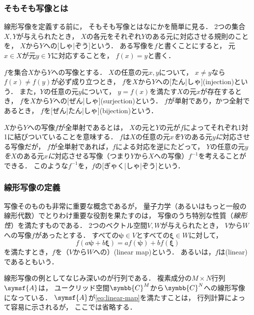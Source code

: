 \documentclass[
]{sotsu}
\newcommand{\bpsi}{\symbf{\psi}}
\newcommand{\bxi}{\symbf{\xi}}
\newcommand{\fire}[1]{\textcolor{fire}{#1}}
\newcommand{\water}[1]{\textcolor{water}{#1}}
\begin{document}
\subsubsection{そもそも写像とは}

\quad
線形写像を定義する前に，
そもそも写像とはなにかを簡単に見る．
2つの集合$X, Y$が与えられたとき，
$X$の各元をそれぞれ$Y$のある元に対応させる規則のことを，
$X$から$Y$への[しゃ|ぞう]という．
ある写像を$f$と書くことにすると，
元$x \in X$が元$y \in Y$に対応することを，
$f(x) = y$と書く．

$f$を集合$X$から$Y$への写像とする．
$X$の任意の元$x, y$について，
$x \neq y$なら$f(x) \neq f(y)$が必ず成り立つとき，
$f$を$X$から$Y$への[たん|しゃ](injection)という．
また，$Y$の任意の元$y$について，
$y = f(x)$を満たす$X$の元$x$が存在するとき，
$f$を$X$から$Y$への[ぜん|しゃ](surjection)という．
$f$が単射であり，かつ全射であるとき，
$f$を[ぜん|たん|しゃ](bijection)という．

$X$から$Y$への写像$f$が全単射であるとは，
$X$の元と$Y$の元が$f$によってそれぞれ1対1に結びついていることを意味する．
$f$は\fire{$X$の任意の元$x$\emph{を}}\water{$Y$のある元$y$\emph{に}}対応させる写像だが，
$f$が全単射であれば，$f$による対応を逆にたどって，
\water{$Y$の任意の元$y$\emph{を}}\fire{$X$のある元$x$\emph{に}}対応させる写像（つまり$Y$から$X$への写像）$f^{-1}$を考えることができる．
このような$f^{-1}$を，$f$の[ぎゃく|しゃ|ぞう]という．


\subsubsection{線形写像の定義}

写像そのものも非常に重要な概念であるが，
量子力学（あるいはもっと一般の線形代数）でとりわけ重要な役割を果たすのは，
写像のうち特別な性質（\emph{線形性}）を満たすものである．
2つのベクトル空間$V, W$が与えられたとき，
$V$から$W$への写像$f$があったとする．
すべての$\bpsi \in V$とすべての$\bxi \in W$に対して，
\begin{equation}
    \label{eq:linear-map}
    f(a \bpsi + b \bxi)
        = a f(\bpsi) + b f(\bxi)
\end{equation}
を満たすとき，$f$を（$V$から$W$への）(linear map)という．
あるいは，$f$は(linear)であるともいう．

線形写像の例としてなじみ深いのが行列である．
複素成分の$M \times N$行列$\symsf{A}$は，
ユークリッド空間$\symbb{C}^M$から$\symbb{C}^N$への線形写像になっている．
$\symsf{A}$が\cref{eq:linear-map}を満たすことは，
行列計算によって容易に示されるが，
ここでは省略する．
\end{document}

